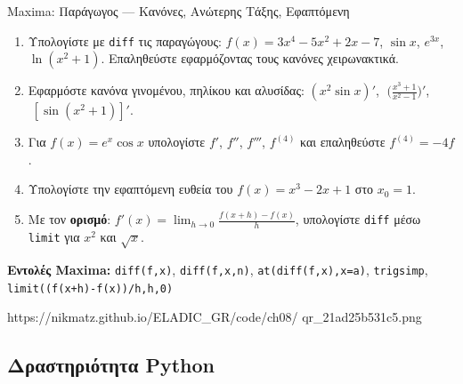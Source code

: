 %

\casactivbox%
  {Maxima: Παράγωγος — Κανόνες, Ανώτερης Τάξης, Εφαπτόμενη}%
  {%
    \label{cas:ch8_derivatives}
    \begin{enumerate}[label=(\alph*),itemsep=2pt]
      \item Υπολογίστε με \texttt{diff} τις παραγώγους:
        $f(x)=3x^4-5x^2+2x-7$, $\sin x$, $e^{3x}$, $\ln(x^2+1)$.
        Επαληθεύστε εφαρμόζοντας τους κανόνες χειρωνακτικά.
      \item Εφαρμόστε κανόνα γινομένου, πηλίκου και αλυσίδας:
        $(x^2\sin x)'$, $\;\bigl(\frac{x^3+1}{x^2-1}\bigr)'$,
        $\;[\sin(x^2+1)]'$.
      \item Για $f(x)=e^x\cos x$ υπολογίστε $f'$, $f''$, $f'''$,
        $f^{(4)}$ και επαληθεύστε $f^{(4)}=-4f$.
      \item Υπολογίστε την εφαπτόμενη ευθεία του
        $f(x)=x^3-2x+1$ στο $x_0=1$.
      \item Με τον \textbf{ορισμό}: $f'(x)=\lim_{h\to0}\frac{f(x+h)-f(x)}{h}$,
        υπολογίστε \texttt{diff} μέσω \texttt{limit} για $x^2$ και $\sqrt{x}$.
    \end{enumerate}
    \smallskip
    \textbf{Εντολές Maxima:}
    \texttt{diff(f,x)}, \texttt{diff(f,x,n)},
    \texttt{at(diff(f,x),x=a)}, \texttt{trigsimp},
    \texttt{limit((f(x+h)-f(x))/h,h,0)}
  }%
  {https://nikmatz.github.io/ELADIC_GR/code/ch08/}%
  {qr_21ad25b531c5.png}

\subsection*{Δραστηριότητα Python}

